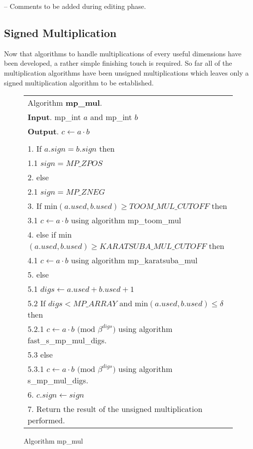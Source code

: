 \documentclass[b5paper]{book}
\begin{document}
-- Comments to be added during editing phase.

\subsection{Signed Multiplication}
Now that algorithms to handle multiplications of every useful dimensions have been developed, a rather simple finishing touch is required.  So far all
of the multiplication algorithms have been unsigned multiplications which leaves only a signed multiplication algorithm to be established.  

\newpage\begin{figure}[!here]
\begin{small}
\begin{center}
\begin{tabular}{l}
\hline Algorithm \textbf{mp\_mul}. \\
\textbf{Input}.   mp\_int $a$ and mp\_int $b$ \\
\textbf{Output}.  $c \leftarrow a \cdot b$ \\
\hline \\
1.  If $a.sign = b.sign$ then \\
\hspace{3mm}1.1  $sign = MP\_ZPOS$ \\
2.  else \\
\hspace{3mm}2.1  $sign = MP\_ZNEG$ \\
3.  If min$(a.used, b.used) \ge TOOM\_MUL\_CUTOFF$ then  \\
\hspace{3mm}3.1  $c \leftarrow a \cdot b$ using algorithm mp\_toom\_mul \\
4.  else if min$(a.used, b.used) \ge KARATSUBA\_MUL\_CUTOFF$ then \\
\hspace{3mm}4.1  $c \leftarrow a \cdot b$ using algorithm mp\_karatsuba\_mul \\
5.  else \\
\hspace{3mm}5.1  $digs \leftarrow a.used + b.used + 1$ \\
\hspace{3mm}5.2  If $digs < MP\_ARRAY$ and min$(a.used, b.used) \le \delta$ then \\
\hspace{6mm}5.2.1  $c \leftarrow a \cdot b \mbox{ (mod }\beta^{digs}\mbox{)}$ using algorithm fast\_s\_mp\_mul\_digs.  \\
\hspace{3mm}5.3  else \\
\hspace{6mm}5.3.1  $c \leftarrow a \cdot b \mbox{ (mod }\beta^{digs}\mbox{)}$ using algorithm s\_mp\_mul\_digs.  \\
6.  $c.sign \leftarrow sign$ \\
7.  Return the result of the unsigned multiplication performed. \\
\hline
\end{tabular}
\end{center}
\end{small}
\caption{Algorithm mp\_mul}
\end{figure}
\end{document}

